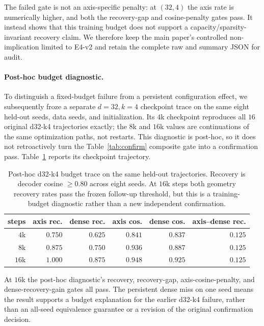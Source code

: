 \documentclass{article}
\theoremstyle{plain}
\begin{document}
{The failed gate is not an axis-specific penalty: at $(32,4)$ the axis rate is numerically higher, and both the recovery-gap and cosine-penalty gates pass. It instead shows that this training budget does not support a capacity/sparsity-invariant recovery claim. We therefore keep the main paper's controlled non-implication limited to E4-v2 and retain the complete raw and summary JSON for audit.

\paragraph{Post-hoc budget diagnostic.} To distinguish a fixed-budget failure from a persistent configuration effect, we subsequently froze a separate $d{=}32,k{=}4$ checkpoint trace on the same eight held-out seeds, data seeds, and initialization. Its $4$k checkpoint reproduces all $16$ original d32-k4 trajectories exactly; the $8$k and $16$k values are continuations of the same optimization paths, not restarts. This diagnostic is post-hoc, so it does not retroactively turn the Table~\ref{tab:confirm} composite gate into a confirmation pass. Table~\ref{tab:budget_trace} reports its checkpoint trajectory.

\begin{table}[H]
\caption{Post-hoc d32-k4 budget trace on the same held-out trajectories. Recovery is decoder cosine $\ge 0.80$ across eight seeds. At $16$k steps both geometry recovery rates pass the frozen follow-up threshold, but this is a training-budget diagnostic rather than a new independent confirmation.}
\label{tab:budget_trace}
\begin{center}
\scriptsize
\begin{tabular}{@{}rrrrrr@{}}
\toprule
steps & axis rec. & dense rec. & axis cos. & dense cos. & axis--dense rec. \\
\midrule
$4$k & $0.750$ & $0.625$ & $0.841$ & $0.837$ & $0.125$ \\
$8$k & $0.875$ & $0.750$ & $0.936$ & $0.887$ & $0.125$ \\
$16$k & $1.000$ & $0.875$ & $0.948$ & $0.925$ & $0.125$ \\
\bottomrule
\end{tabular}
\end{center}
\end{table}

At $16$k the post-hoc diagnostic's recovery, recovery-gap, axis-cosine-penalty, and dense-recovery-gain gates all pass. The persistent dense miss on one seed means the result supports a budget explanation for the earlier d32-k4 failure, rather than an all-seed equivalence guarantee or a revision of the original confirmation decision.

}
\end{document}
